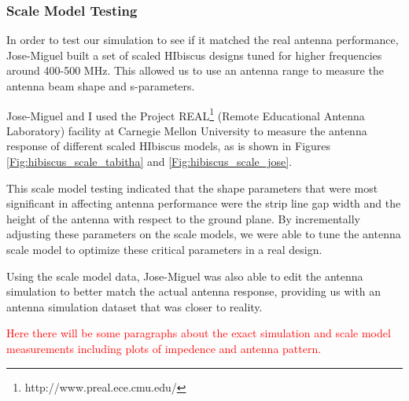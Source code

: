 \subsubsection{Scale Model Testing}
In order to test our simulation to see if it matched the real antenna performance, Jose-Miguel built a set of scaled HIbiscus designs tuned for higher frequencies around 400-500 MHz. This allowed us to use an antenna range to measure the antenna beam shape and s-parameters. 

Jose-Miguel and I used the Project REAL\footnote{http://www.preal.ece.cmu.edu/} (Remote Educational Antenna Laboratory) facility at Carnegie Mellon University to measure the antenna response of different scaled HIbiscus models, as is shown in Figures \ref{Fig:hibiscus_scale_tabitha} and \ref{Fig:hibiscus_scale_jose}. 

This scale model testing indicated that the shape parameters that were most significant in affecting antenna performance were the strip line gap width and the height of the antenna with respect to the ground plane. By incrementally adjusting these parameters on the scale models, we were able to tune the antenna scale model to optimize these critical parameters in a real design. 

Using the scale model data, Jose-Miguel was also able to edit the antenna simulation to better match the actual antenna response, providing us with an antenna simulation dataset that was closer to reality. 

\textcolor{red}{Here there will be some paragraphs about the exact simulation and scale model measurements including plots of impedence and antenna pattern.}

